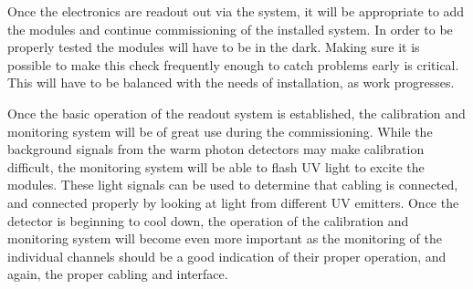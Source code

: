 Once the electronics are readout out via the  system, it will be appropriate to add the  modules and continue commissioning of the installed system.  In order to be properly tested the  modules will have to be in the dark.  Making sure it is possible to make this check frequently enough to catch problems early is critical. This will have to be balanced with the needs of installation, as work progresses.  

Once the basic operation of the readout system is established, the calibration and monitoring system will be of great use during the commissioning.  While the background signals from the warm photon detectors may make calibration difficult, the monitoring system will be able to flash UV light to excite the  modules.  These light signals can be used to determine that cabling is connected, and connected properly by looking at light from different UV emitters.  Once the detector is beginning to cool down, the operation of the calibration and monitoring system will become even more important as the monitoring of the individual channels should be a good indication of their proper operation, and again, the proper cabling and interface.


%




 


